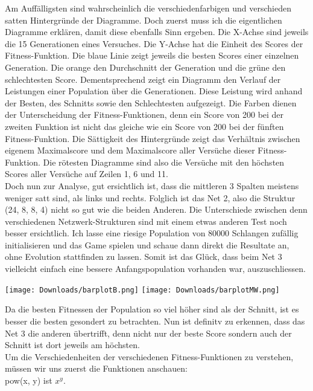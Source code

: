 \documentclass[11pt,a4paper,ngerman]{article}
\begin{document}
Am Auffälligsten sind wahrscheinlich die verschiedenfarbigen und verschieden satten Hintergründe der Diagramme. Doch zuerst muss ich die eigentlichen Diagramme erklären, damit diese ebenfalls Sinn ergeben. Die X-Achse sind jeweils die 15 Generationen eines Versuches. Die Y-Achse hat die Einheit des Scores der Fitness-Funktion. Die blaue Linie zeigt jeweils die besten Scores einer einzelnen Generation. Die orange den Durchschnitt der Generation und die grüne den schlechtesten Score. Dementsprechend zeigt ein Diagramm den Verlauf der Leistungen einer Population über die Generationen. Diese Leistung wird anhand der Besten, des Schnitts sowie den Schlechtesten aufgezeigt. Die Farben dienen der Unterscheidung der Fitness-Funktionen, denn ein Score von 200 bei der zweiten Funktion ist nicht das gleiche wie ein Score von 200 bei der fünften Fitness-Funktion. Die Sättigkeit des Hintergründe zeigt das Verhältnis zwischen eigenem Maximalscore und dem Maximalscore aller Versüche dieser Fitness-Funktion. Die rötesten Diagramme sind also die Versüche mit den höchsten Scores aller Versüche auf Zeilen 1, 6 und 11.\\

Doch nun zur Analyse, gut ersichtlich ist, dass die mittleren 3 Spalten meistens weniger satt sind, als links und rechts. Folglich ist das Net 2, also die Struktur (24, 8, 8, 4) nicht so gut wie die beiden Anderen. Die Unterschiede zwischen denn verschiedenen Netzwerk-Strukturen sind mit einem etwas anderen Test noch besser ersichtlich. Ich lasse eine riesige Population von 80000 Schlangen zufällig initialisieren und das Game spielen und schaue dann direkt die Resultate an, ohne Evolution stattfinden zu lassen. Somit ist das Glück, dass beim Net 3 vielleicht einfach eine bessere Anfangspopulation vorhanden war, auszuschliessen.

\begin{center}
    \texttt{[image: Downloads/barplotB.png]}
    \texttt{[image: Downloads/barplotMW.png]}
\end{center}

Da die besten Fitnessen der Population so viel höher sind als der Schnitt, ist es besser die besten gesondert zu betrachten. Nun ist definitv zu erkennen, dass das Net 3 die anderen übertrifft, denn nicht nur der beste Score sondern auch der Schnitt ist dort jeweils am höchsten.\\

Um die Verschiedenheiten der verschiedenen Fitness-Funktionen zu verstehen, müssen wir uns zuerst die Funktionen anschauen:\\
pow(x, y) ist $x^y$.
\end{document}
